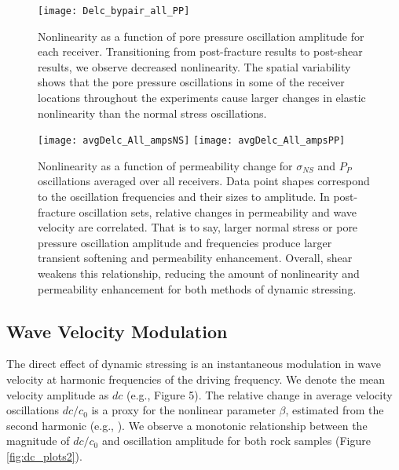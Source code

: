 \documentclass[draft]{agujournal2019}
\begin{document}
\begin{figure*}[ht]
	\centering
	\texttt{[image: Delc\_bypair\_all\_PP]}
	\caption{Nonlinearity as a function of pore pressure oscillation amplitude for each receiver. Transitioning from post-fracture results to post-shear results, we observe decreased nonlinearity. The spatial variability shows that the pore pressure oscillations in some of the receiver locations throughout the experiments cause larger changes in elastic nonlinearity than the normal stress oscillations.}
	\label{fig:delc_plots_pp}
\end{figure*}

\begin{figure*}[ht]
	\texttt{[image: avgDelc\_All\_ampsNS]}
	\texttt{[image: avgDelc\_All\_ampsPP]}
	\caption{Nonlinearity as a function of permeability change for $ \sigma_{NS} $ and $ P_P $ oscillations averaged over all receivers. Data point shapes correspond to the oscillation frequencies and their sizes to amplitude. In post-fracture oscillation sets, relative changes in permeability and wave velocity are correlated. That is to say, larger normal stress or pore pressure oscillation amplitude and frequencies produce larger transient softening and permeability enhancement. Overall, shear weakens this relationship, reducing the amount of nonlinearity and permeability enhancement for both methods of dynamic stressing. }
	\label{fig:delc_plots2}
\end{figure*}


\subsection{Wave Velocity Modulation}

The direct effect of dynamic stressing is an instantaneous modulation in wave velocity at harmonic frequencies of the driving frequency. We denote the mean velocity amplitude as $ dc $ (e.g., Figure 5). The relative change in average velocity oscillations $ dc/c_0 $ is a proxy for the nonlinear parameter $ \beta $, estimated from the second harmonic (e.g., \cite{Guyer09,Riviere13,Riviere15}). We observe a monotonic relationship between the magnitude of $ dc/c_0 $ and oscillation amplitude for both rock samples (Figure \ref{fig:dc_plots2}).
\end{document}
